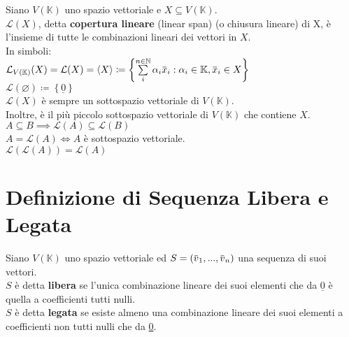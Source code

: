 \documentclass[a4paper, twoside, italian, 11pt]{book}
\newcommand{\braces}[1] {\left \{ #1 \right \}}
\newcommand{\overbar}[1] {\mkern 1.5mu\overline{\mkern-1.5mu#1\mkern-1.5mu}\mkern 1.5mu}
\newcommand{\N}{\mathbb N}
\newcommand{\K}{\mathbb K}
\newcommand{\LS}{\mathcal L}
\let\emptyset\varnothing
\begin{document}
Siano $V(\K)$ uno spazio vettoriale e $X \subseteq V(\K)$. \\

\noindent
$\LS(X)$, detta \textbf{copertura lineare} (linear span) (o chiusura lineare) di X, è l'insieme di tutte le combinazioni lineari dei vettori in $X$. \\

\noindent
In simboli: \\

$\LS_{V(\K)}(X) = \LS(X) = \left < X \right > \coloneqq \braces{\sum\limits_i^{n \in \N} \alpha_i \overbar x_i : \alpha_i \in \K, \overbar x_i \in X}$ \\

$\LS(\emptyset) \coloneqq \braces{\underline 0}$ \\

\noindent
$\LS(X)$ è sempre un sottospazio vettoriale di $V(\K)$. \\
Inoltre, è il più piccolo sottospazio vettoriale di $V(\K)$ che contiene $X$. \\


\noindent
$A \subseteq B \implies \LS(A) \subseteq \LS(B)$ \\
$A = \LS(A) \iff A$ è sottospazio vettoriale. \\
$\LS(\LS(A)) = \LS(A)$



\section{Definizione di Sequenza Libera e Legata}

Siano $V(\K)$ uno spazio vettoriale ed $S = (\overbar v_1, ..., \overbar v_n)$ una sequenza di suoi vettori. \\

\noindent
$S$ è detta \textbf{libera} se l'unica combinazione lineare dei suoi  elementi che da $\underline 0$ è quella a coefficienti tutti nulli. \\

\noindent
$S$ è detta \textbf{legata} se esiste almeno una combinazione lineare dei suoi elementi a coefficienti non tutti nulli che da {\underline 0}. \\
\end{document}
